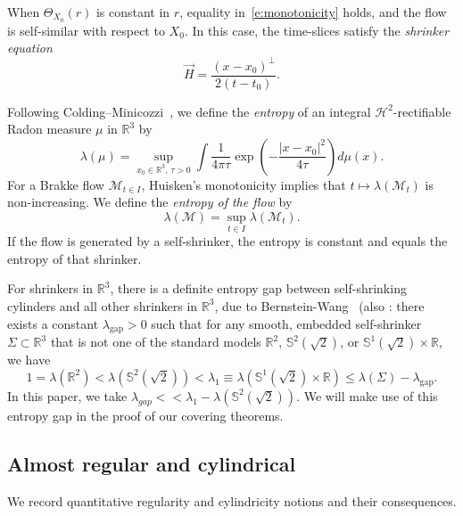 \documentclass[11pt,reqno]{amsart}
\numberwithin{equation}{section}
\newcommand{\RR}{\mathds{R}}
\theoremstyle{definition}
\theoremstyle{remark}
\theoremstyle{remark}
\theoremstyle{remark}
\theoremstyle{remark}\newtheorem{conjecture}[equation]{Conjecture}
\theoremstyle{remark}\newtheorem{question}[equation]{Question}
\begin{document}
When $\Theta_{X_0}(r)$ is constant in $r$, equality in~\eqref{e:monotonicity} holds, and the flow is self-similar with respect to $X_0$.  
In this case, the time-slices satisfy the \emph{shrinker equation}
\[
    \vec{H} = \frac{(x - x_0)^{\perp}}{2(t - t_0)}.
\]

Following Colding–Minicozzi~\cite{CM12}, we define the \emph{entropy} of an integral $\mathcal{H}^2$-rectifiable Radon measure $\mu$ in $\mathbb{R}^3$ by
\[
    \lambda(\mu)
    = \sup_{x_0 \in \mathbb{R}^3,\, \tau > 0}
    \int \frac{1}{4\pi \tau}
    \exp\!\left( -\frac{|x - x_0|^2}{4\tau} \right)
    d\mu(x).
\]
For a Brakke flow $\mathcal{M}_{t \in I}$, Huisken’s monotonicity implies that
$t \mapsto \lambda(\mathcal{M}_t)$ is non-increasing.  
We define the \emph{entropy of the flow} by
\[
    \lambda(\mathcal{M}) = \sup_{t \in I} \lambda(\mathcal{M}_t).
\]
If the flow is generated by a self-shrinker, the entropy is constant and equals the entropy of that shrinker.

For shrinkers in $\mathbb{R}^3$, there is a definite entropy gap between self-shrinking cylinders and all other shrinkers in $\RR^3$, due to Bernstein-Wang~\cite{BL17} (also \cite{CIMW13, Bre16}: there exists a constant $\lambda_{\mathrm{gap}} > 0$ such that for any smooth, embedded self-shrinker
$\Sigma \subset \mathbb{R}^3$ that is not one of the standard models $\mathbb{R}^2$, $\mathbb{S}^2(\sqrt{2})$, or $\mathbb{S}^1(\sqrt{2}) \times \mathbb{R}$, we have
\begin{equation}\label{e:entropy gap}
    1 = \lambda(\mathbb{R}^2)
    < \lambda(\mathbb{S}^2(\sqrt{2}))
    < \lambda_1 \equiv \lambda(\mathbb{S}^1(\sqrt{2}) \times \mathbb{R})
    \le \lambda(\Sigma) - \lambda_{\mathrm{gap}}.
\end{equation}
In this paper, we take $\lambda_{gap}<< \lambda_1 -\lambda(\mathbb{S}^2(\sqrt{2}))  $. We will make use of this entropy gap in the proof of our covering theorems.
















\subsection{Almost regular and cylindrical}


We record quantitative regularity and cylindricity notions and their consequences.
\end{document}
